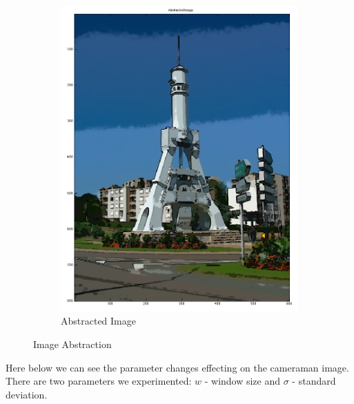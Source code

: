\documentclass[12pt]{article}
\begin{document}
\begin{figure}[ht!]
\begin{subfigure}[b]{0.45\textwidth}
                \includegraphics[width=\textwidth]{ae1}
                \caption{Abstracted Image}
        \end{subfigure}
        \caption{Image Abstraction}
\end{figure}
\pagebreak

Here below we can see the parameter changes effecting on the cameraman image. There are two parameters we experimented: $w$ - window size and $\sigma$ - standard deviation.
\end{document}

